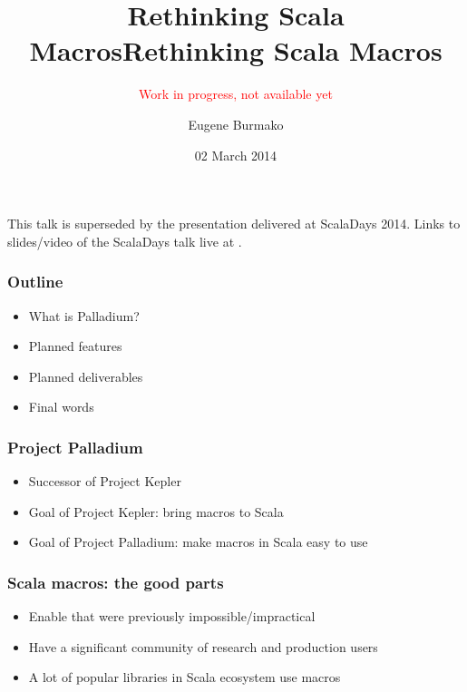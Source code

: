 \documentclass[svgnames,dvipsnames,hyperref={bookmarks=false}]{beamer}
\title{Rethinking Scala Macros}
\begin{document}
\title{Rethinking Scala Macros}
\subtitle{\textcolor{red}{Work in progress, not available yet}}
\author{Eugene Burmako}
\date{02 March 2014}

{
\begin{frame}
  \titlepage
  This talk is superseded by the presentation delivered at ScalaDays 2014. Links to slides/video of the ScalaDays talk live at .
\end{frame}
}

\begin{frame}[fragile]
\frametitle{Outline}

\begin{itemize}
\item What is Palladium?
\item Planned features
\item Planned deliverables
\item Final words
\end{itemize}
\end{frame}

\begin{frame}[fragile]
\frametitle{}

\vskip40pt
\begin{center}
\end{center}
\end{frame}

\begin{frame}[fragile]
\frametitle{Project Palladium}

\begin{itemize}
\item Successor of Project Kepler
\item Goal of Project Kepler: bring macros to Scala
\item Goal of Project Palladium: make macros in Scala easy to use
\end{itemize}
\end{frame}

\begin{frame}[fragile]
\frametitle{Scala macros: the good parts}

\begin{itemize}
\item Enable  that were previously impossible/impractical
\item Have a significant community of research and production users
\item A lot of popular libraries in Scala ecosystem use macros
\end{itemize}
\end{frame}
\end{document}
